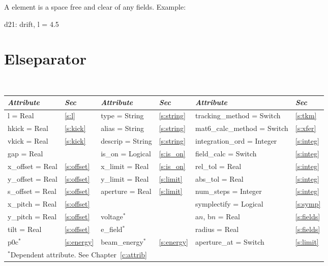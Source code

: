 A  element is a space free and clear of any fields.
Example:
\begin{example}
  d21: drift, l = 4.5
\end{example}

\section{Elseparator}
\label{s:elsep}

\begin{center}
\tt
\begin{tabular}{|l|l||l|l||l|l|} \hline
  {\sl Attribute} & {\sl Sec}  & {\sl Attribute} & {\sl Sec} & {\sl Attribute} & {\sl Sec} \\ \hline
  l        = Real    & \ref{s:l}      & type = String    & \ref{s:string} & tracking\_method = Switch   & \ref{s:tkm}    \\ \hline
  hkick    = Real    & \ref{s:kick}   & alias = String   & \ref{s:string} & mat6\_calc\_method = Switch & \ref{s:xfer}   \\ \hline
  vkick    = Real    & \ref{s:kick}   & descrip = String & \ref{s:string} & integration\_ord = Integer  & \ref{s:integ}  \\ \hline
  gap      = Real    &                & is\_on = Logical & \ref{s:is_on}  & field\_calc = Switch        & \ref{s:integ}  \\ \hline
  x\_offset  = Real  & \ref{s:offset} & x\_limit = Real  & \ref{s:is_on}  & rel\_tol = Real             & \ref{s:integ}  \\ \hline
  y\_offset  = Real  & \ref{s:offset} & y\_limit = Real  & \ref{s:limit}  & abs\_tol = Real             & \ref{s:integ}  \\ \hline
  s\_offset  = Real  & \ref{s:offset} & aperture = Real  & \ref{s:limit}  & num\_steps = Integer        & \ref{s:integ}  \\ \hline
  x\_pitch = Real    & \ref{s:offset} &                  &                & symplectify = Logical       & \ref{s:symp}   \\ \hline
  y\_pitch = Real    & \ref{s:offset} & voltage$^*$      &                & a$n$, b$n$ = Real           & \ref{s:fields} \\ \hline
  tilt     = Real    & \ref{s:offset} & e\_field$^*$     &                & radius = Real               & \ref{s:fields} \\ \hline
  p0c$^*$            & \ref{s:energy} & beam\_energy$^*$ & \ref{s:energy} & aperture\_at = Switch       & \ref{s:limit}  \\ \hline
  \multicolumn{6}{l}{\small $^*$Dependent attribute. See Chapter~\ref{c:attrib}} \\
\end{tabular}
\end{center}
\toffset

